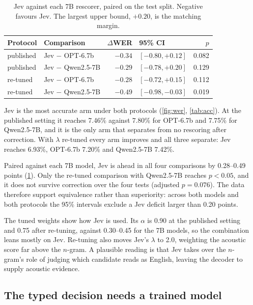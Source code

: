 \documentclass[11pt]{article}
\begin{document}
\begin{table}[t]
\centering\small
\begin{tabular}{llrlr}
\toprule
Protocol & Comparison & $\Delta$WER & 95\% CI & $p$ \\
\midrule
published & Jev $-$ OPT-6.7b & $-0.34$ & $[-0.80, +0.12]$ & 0.082 \\
published & Jev $-$ Qwen2.5-7B & $-0.29$ & $[-0.78, +0.20]$ & 0.129 \\
re-tuned & Jev $-$ OPT-6.7b & $-0.28$ & $[-0.72, +0.15]$ & 0.112 \\
re-tuned & Jev $-$ Qwen2.5-7B & $-0.49$ & $[-0.98, -0.03]$ & 0.019 \\
\bottomrule
\end{tabular}
\caption{Jev against each 7B rescorer, paired on the test split. Negative favours Jev. The
largest upper bound, $+0.20$, is the matching margin.}
\label{tab:pair}
\end{table}

Jev is the most accurate arm under both protocols (\cref{fig:wer}, \cref{tab:acc}). At
the published setting it reaches 7.46\% against 7.80\% for OPT-6.7b and 7.75\% for
Qwen2.5-7B, and it is the only arm that separates from no rescoring after correction.
With $\lambda$ re-tuned every arm improves and all three separate: Jev reaches 6.93\%,
OPT-6.7b 7.20\% and Qwen2.5-7B 7.42\%.

Paired against each 7B model, Jev is ahead in all four comparisons by 0.28--0.49 points
(\cref{tab:pair}). Only the re-tuned comparison with Qwen2.5-7B reaches $p < 0.05$, and it
does not survive correction over the four tests (adjusted $p = 0.076$). The data therefore
support equivalence rather than superiority: across both models and both protocols the
95\% intervals exclude a Jev deficit larger than 0.20 points.

The tuned weights show how Jev is used. Its $\alpha$ is 0.90 at the published setting
and 0.75 after re-tuning, against 0.30--0.45 for the 7B models, so the combination leans
mostly on Jev. Re-tuning also moves Jev's $\lambda$ to 2.0, weighting the acoustic score
far above the $n$-gram. A plausible reading is that Jev takes over the $n$-gram's role
of judging which candidate reads as English, leaving the decoder to supply acoustic
evidence.

\subsection{The typed decision needs a trained model}
\label{sec:collapse}
\end{document}
